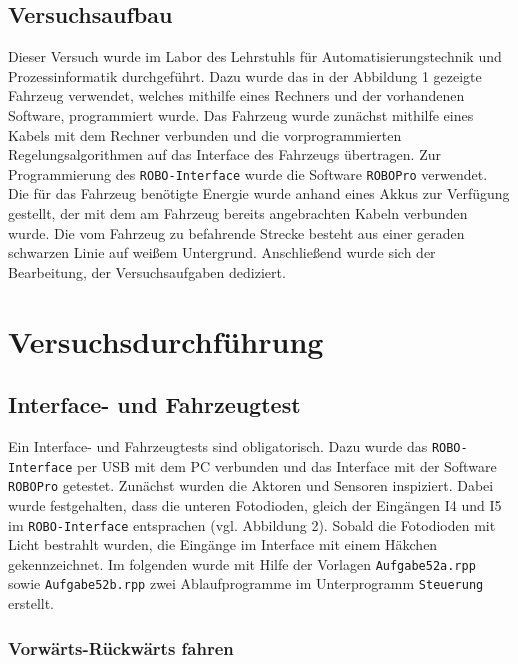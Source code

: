 \documentclass[a4paper, 12pt]{article}
\begin{document}
\subsection*{Versuchsaufbau}
Dieser Versuch wurde im Labor des Lehrstuhls für Automatisierungstechnik und Prozessinformatik durchgeführt. Dazu wurde das in der Abbildung 1 gezeigte Fahrzeug verwendet, welches mithilfe eines Rechners und der vorhandenen Software, programmiert wurde. Das Fahrzeug wurde zunächst mithilfe eines Kabels mit dem Rechner verbunden und die vorprogrammierten Regelungsalgorithmen auf das Interface des Fahrzeugs übertragen. Zur Programmierung des \texttt{ROBO-Interface} wurde die Software \texttt{ROBOPro} verwendet.
Die für das Fahrzeug benötigte Energie wurde anhand eines Akkus zur Verfügung gestellt, der mit dem am Fahrzeug bereits angebrachten Kabeln verbunden wurde. Die vom Fahrzeug zu befahrende Strecke besteht aus einer geraden schwarzen Linie auf weißem Untergrund.
Anschließend wurde sich der Bearbeitung, der Versuchsaufgaben dediziert. 


\section*{Versuchsdurchführung}

\subsection*{Interface- und Fahrzeugtest}
Ein Interface- und Fahrzeugtests sind obligatorisch. Dazu wurde das \texttt{ROBO-Interface} per USB mit dem PC verbunden und das Interface mit der Software \texttt{ROBOPro} getestet.  
Zunächst wurden die Aktoren und Sensoren inspiziert. Dabei wurde festgehalten, dass die unteren Fotodioden, gleich der Eingängen I4 und I5 im \texttt{ROBO-Interface} entsprachen (vgl. Abbildung 2). Sobald die Fotodioden mit Licht bestrahlt wurden, die Eingänge im Interface mit einem Häkchen gekennzeichnet.  
Im folgenden wurde mit Hilfe der Vorlagen \texttt{Aufgabe52a.rpp} sowie \texttt{Aufgabe52b.rpp} zwei Ablaufprogramme im Unterprogramm \texttt{Steuerung} erstellt. 

\subsubsection*{Vorwärts-Rückwärts fahren}
\end{document}
